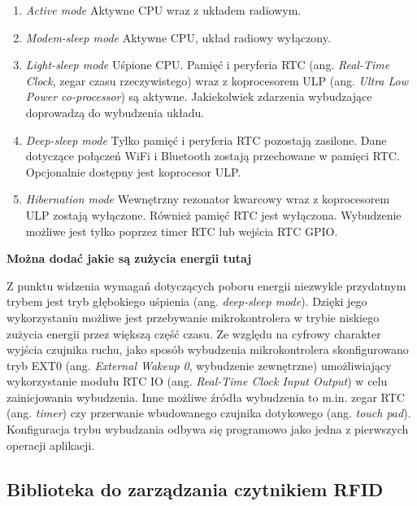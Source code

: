             \begin{enumerate}
                \item \textit{Active mode}
                    Aktywne CPU wraz z układem radiowym.

                \item \textit{Modem-sleep mode}
                    Aktywne CPU, układ radiowy wyłączony.
                
                \item \textit{Light-sleep mode}
                    Uśpione CPU. Pamięć i peryferia RTC (ang. \textit{Real-Time Clock}, zegar czasu rzeczywistego) wraz z koprocesorem ULP (ang. \textit{Ultra Low Power co-processor}) są aktywne. Jakiekolwiek zdarzenia wybudzające doprowadzą do wybudzenia układu.

                \item \textit{Deep-sleep mode}
                    Tylko pamięć i peryferia RTC pozostają zasilone. Dane dotyczące połączeń WiFi i Bluetooth zostają przechowane w pamięci RTC. Opcjonalnie dostępny jest koprocesor ULP.

                \item \textit{Hibernation mode}
                    Wewnętrzny rezonator kwarcowy wraz z koprocesorem ULP zostają wyłączone. Również pamięć RTC jest wyłączona. Wybudzenie możliwe jest tylko poprzez timer RTC lub wejścia RTC GPIO.

            \end{enumerate}

            \textbf{Można dodać jakie są zużycia energii tutaj}

            Z punktu widzenia wymagań dotyczących poboru energii niezwykle przydatnym trybem jest tryb głębokiego uśpienia (ang. \textit{deep-sleep mode}). Dzięki jego wykorzystaniu możliwe jest przebywanie mikrokontrolera w trybie niskiego zużycia energii przez większą część czasu. Ze względu na cyfrowy charakter wyjścia czujnika ruchu, jako sposób wybudzenia mikrokontrolera skonfigurowano tryb EXT0 (ang. \textit{External Wakeup 0}, wybudzenie zewnętrzne) umożliwiający wykorzystanie modułu RTC IO (ang. \textit{Real-Time Clock Input Output}) w celu zainicjowania wybudzenia. Inne możliwe źródła wybudzenia to m.in. zegar RTC (ang. \textit{timer}) czy przerwanie wbudowanego czujnika dotykowego (ang. \textit{touch pad}). Konfiguracja trybu wybudzania odbywa się programowo jako jedna z pierwszych operacji aplikacji.

        \subsection{Biblioteka do zarządzania czytnikiem RFID}

